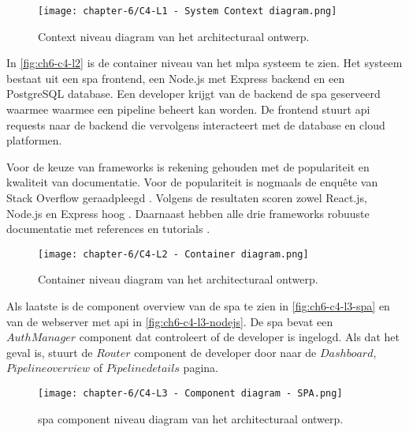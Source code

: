 \begin{figure}[hbt!]
  \centering
  \texttt{[image: chapter-6/C4-L1 - System Context diagram.png]}
  \caption{Context niveau diagram van het architecturaal ontwerp.}
  \label{fig:ch6-c4-l1}
\end{figure}

In \autoref{fig:ch6-c4-l2} is de container niveau van het \Acrshort{mlpa} systeem te zien. Het systeem bestaat uit een \acrfull{spa} frontend, een Node.js met Express backend en een PostgreSQL database. Een developer krijgt van de backend de \Acrshort{spa} geserveerd waarmee waarmee een pipeline beheert kan worden. De frontend stuurt \Acrshort{api} requests naar de backend die vervolgens interacteert met de database en cloud platformen.

Voor de keuze van frameworks is rekening gehouden met de populariteit en kwaliteit van documentatie. Voor de populariteit is nogmaals de enquête van Stack Overflow geraadpleegd \cite{stack-overflow-survey-2020}. Volgens de resultaten scoren zowel React.js, Node.js en Express hoog \cite{stack-overflow-survey-2020-technology-web-frameworks} \cite{stack-overflow-survey-2020-popular-framework-libraries-tools}. Daarnaast hebben alle drie frameworks robuuste documentatie met references en tutorials \cite{reactjs-docs} \cite{nodejs-docs} \cite{expressjs-docs}.

\begin{figure}[hbt!]
  \centering
  \texttt{[image: chapter-6/C4-L2 - Container diagram.png]}
  \caption{Container niveau diagram van het architecturaal ontwerp.}
  \label{fig:ch6-c4-l2}
\end{figure}

\newpage

Als laatste is de component overview van de \acrshort{spa} te zien in \autoref{fig:ch6-c4-l3-spa} en van de webserver met \acrshort{api} in \autoref{fig:ch6-c4-l3-nodejs}. De \acrshort{spa} bevat een \(AuthManager\) component dat controleert of de developer is ingelogd. Als dat het geval is, stuurt de \(Router\) component de developer door naar de \(Dashboard\), \(Pipeline overview\) of \(Pipeline details\) pagina.

\begin{figure}[hbt!]
  \centering
  \texttt{[image: chapter-6/C4-L3 - Component diagram - SPA.png]}
  \caption{\Acrfull{spa} component niveau diagram van het architecturaal ontwerp.}
  \label{fig:ch6-c4-l3-spa}
\end{figure}

